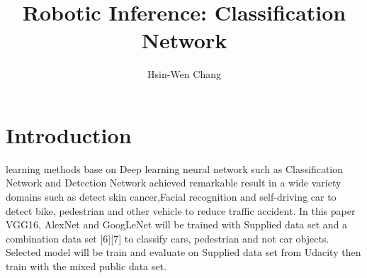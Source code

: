 \documentclass[10pt,journal,compsoc]{IEEEtran}
\begin{document}
\title{Robotic Inference: Classification Network}

\author{Hsin-Wen Chang}

%
{}


\maketitle
\IEEEdisplaynontitleabstractindextext
\IEEEpeerreviewmaketitle
\section{Introduction}
\label{sec:introduction}

 learning methods base on Deep learning neural network such as Classification Network and Detection Network achieved remarkable result in a wide variety domains such as detect skin cancer,Facial recognition and self-driving car to detect bike, pedestrian and other vehicle to reduce traffic accident. In this paper VGG16, AlexNet and GoogLeNet will be trained with Supplied data set and a combination data set [6][7] to classify cars, pedestrian and not car objects. Selected model will be train and evaluate on Supplied data set from Udacity then train with the mixed public data set.
\end{document}

